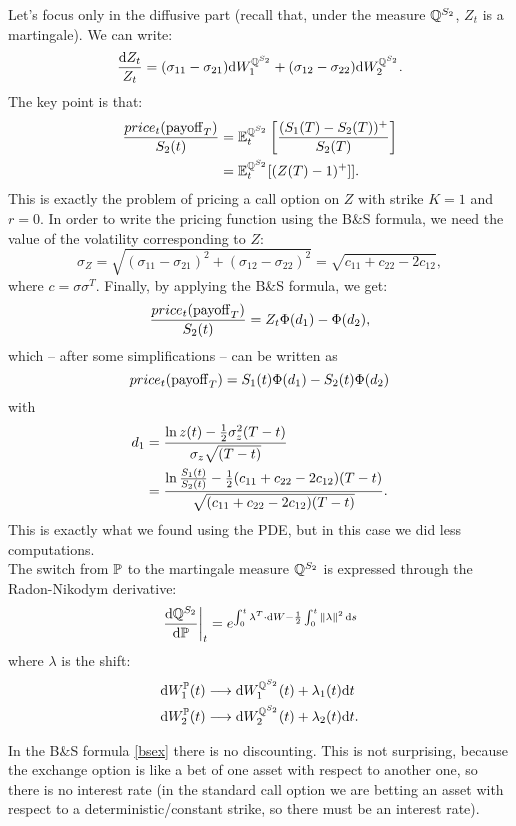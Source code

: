 Let's focus only in the diffusive part (recall that, under the measure $\mathbb{Q}^{S_2}$, $Z_t$ is a martingale). We can write:
\begin{equation}
    \frac{\dd Z_t}{Z_t} = (\sigma_{11}- \sigma_{21})\dd W_1^{\mathbb{Q}^{S_2}} + (\sigma_{12}- \sigma_{22})\dd W_2^{\mathbb{Q}^{S_2}}.
\end{equation}
The key point is that:
\begin{align}
    \frac{price_t(\operatorname{payoff}_T)}{S_2(t)} &= \mathbb{E}_t^{\mathbb{Q}^{S_2}} \left[\frac{(S_1(T)-S_2(T))^+}{S_2(T)}\right]\\
    &=
    \mathbb{E}_t^{\mathbb{Q}^{S_2}}[(Z(T)-1)^+]].
\end{align}
This is exactly the problem of pricing a call option on $Z$ with strike $K=1$ and $r=0$. In order to write the pricing function using the B\&S formula, we need the value of the volatility corresponding to $Z$:
\begin{equation}
    \sigma_Z = \sqrt{(\sigma_{11}- \sigma_{21})^2 + (\sigma_{12}- \sigma_{22})^2} = \sqrt{c_{11}+c_{22}-2c_{12}},
\end{equation}
where $c=\sigma\sigma^T$. Finally, by applying the B\&S formula, we get:
\begin{equation}
    \frac{price_t(\operatorname{payoff}_T)}{S_2(t)} = Z_t\Phi(d_1) - \Phi(d_2),
\end{equation}
which -- after some simplifications -- can be written as
\begin{equation}
    price_t(\operatorname{payoff}_T) = S_1(t)\Phi(d_1) - S_2(t)\Phi(d_2)
\end{equation}
with
\begin{align}
    \notag d_1 &= \dfrac{\ln z(t)-\frac{1}{2}\sigma_z^2(T-t)}{\sigma_z \sqrt{(T-t)}} \\
    &=
    \dfrac{\ln\frac{S_1(t)}{S_2(t)}-\frac{1}{2}(c_{11}+c_{22}-2c_{12})(T-t)}{\sqrt{(c_{11}+c_{22}-2c_{12})(T-t)}}.
\end{align}
This is exactly what we found using the PDE, but in this case we did less computations.\\
The switch from $\mathbb{P}$ to the martingale measure $\mathbb{Q}^{S_2}$ is expressed through the Radon-Nikodym derivative:
\begin{equation}\label{bsex}
    \eval{\frac{\dd\Qmeas^{S_2}}{\dd\Pmeas}}_t = e^{\int_0^t\lambda^T\cdot\dd W - \frac{1}{2}\int_0^t \norm{\lambda}^2\,\dd s}
\end{equation}
where $\lambda$ is the shift:
\begin{align}
    \dd W_1^{\mathbb{P}}(t) &\longrightarrow \dd W_1^{\mathbb{Q}^{S_2}}(t) + \lambda_1(t)\dd t\\
    \dd W_2^{\mathbb{P}}(t) &\longrightarrow \dd W_2^{\mathbb{Q}^{S_2}}(t) + \lambda_2(t)\dd t.
\end{align}
\begin{remark}
    In the B\&S formula \eqref{bsex} there is no discounting. This is not surprising, because the exchange option is like a bet of one asset with respect to another one, so there is no interest rate (in the standard call option we are betting an asset with respect to a deterministic/constant strike, so there must be an interest rate).
\end{remark}

